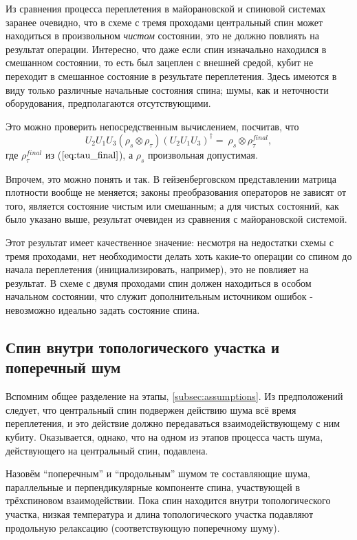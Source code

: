 \documentclass[a4paper,12pt]{article}
\theoremstyle{plain} %
\theoremstyle{definition} %
\theoremstyle{remark} %
\begin{document}
Из сравнения процесса переплетения в майорановской и спиновой системах заранее очевидно, что в схеме с тремя проходами центральный спин может находиться в произвольном \textit{чистом} состоянии, это не должно повлиять на результат операции.
Интересно, что даже если спин изначально находился в смешанном состоянии, то есть был зацеплен с внешней средой, кубит не переходит в смешанное состояние в результате переплетения. 
Здесь имеются в виду только различные начальные состояния спина; шумы, как и неточности оборудования, предполагаются отсутствующими.

Это можно проверить непосредственным вычислением, посчитав, что
\begin{equation}
    U_2 U_1 U_3 (\rho_s \otimes \rho_\tau) (U_2 U_1 U_3)^\dagger =\ \rho_s \otimes \rho^{final}_\tau
    \label{eq:u213_general},
\end{equation}
где $\rho^{final}_\tau$ из ($\ref{eq:tau_final}$), а $\rho_s$ произвольная допустимая.

Впрочем, это можно понять и так. В гейзенберговском представлении матрица плотности вообще не меняется; законы преобразования операторов не зависят от того, является состояние чистым или смешанным; а для чистых состояний, как было указано выше, результат очевиден из сравнения с майорановской системой.

Этот результат имеет качественное значение: несмотря на недостатки схемы с тремя проходами, нет необходимости делать хоть какие-то операции со спином до начала переплетения (инициализировать, например), это не повлияет на результат. 
В схеме с двумя проходами спин должен находиться в особом начальном состоянии, что служит дополнительным источником ошибок - невозможно идеально задать состояние спина.

\subsection{Спин внутри топологического участка и поперечный шум} \label{subsec:inside_transverse}

Вспомним общее разделение на этапы, \ref{subsec:assumptions}. 
Из предположений следует, что центральный спин подвержен действию шума всё время переплетения, и это действие должно передаваться взаимодействующему с ним кубиту. Оказывается, однако, что на одном из этапов процесса часть шума, действующего на центральный спин, подавлена.

Назовём ``поперечным'' и ``продольным'' шумом те составляющие шума, параллельные и перпендикулярные компоненте спина, участвующей в трёхспиновом взаимодействии.
Пока спин находится внутри топологического участка, низкая температура и длина топологического участка подавляют продольную релаксацию (соответствующую поперечному шуму).
\end{document}
